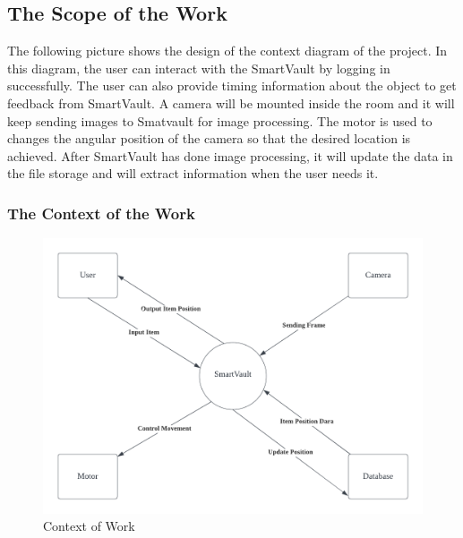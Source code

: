 \documentclass[12pt]{article}
\begin{document}
\subsection{The Scope of the Work}
The following picture shows the design of the context diagram of the project. In this diagram, the user can interact with the SmartVault by logging in successfully. The user can also provide timing information about the object to get feedback from SmartVault. A camera will be mounted inside the room and it will keep sending images to Smatvault for image processing. The motor is used to changes the angular position of the camera so that the desired location is achieved. After SmartVault has done image processing, it will update the data in the file storage and will extract information when the user needs it. 
\subsubsection{The Context of the Work}
\begin{figure}[H]
    \centering
    \includegraphics[scale=0.7]{Context.png}
    \caption{Context of Work}
\end{figure}
\end{document}
